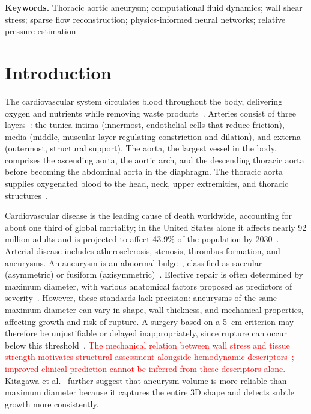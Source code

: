 \documentclass[12pt,a4paper]{article}
\newcommand{\cfdrevision}[1]{\textcolor{red}{#1}}
\theoremstyle{definition}
\numberwithin{equation}{section}
\begin{document}
\noindent\textbf{Keywords.} Thoracic aortic aneurysm; computational fluid dynamics; wall shear stress; sparse flow reconstruction; physics-informed neural networks; relative pressure estimation


\section{Introduction}
\label{sec:introduction}

The cardiovascular system circulates blood throughout the body, delivering oxygen and nutrients while removing waste products~\cite{heymans1960reflexogenic}. Arteries consist of three layers~\cite{holzapfel2010modelling}: the tunica intima (innermost, endothelial cells that reduce friction), media (middle, muscular layer regulating constriction and dilation), and externa (outermost, structural support). The aorta, the largest vessel in the body, comprises the ascending aorta, the aortic arch, and the descending thoracic aorta before becoming the abdominal aorta in the diaphragm. The thoracic aorta supplies oxygenated blood to the head, neck, upper extremities, and thoracic structures~\cite{tran2018anatomy}.

Cardiovascular disease is the leading cause of death worldwide, accounting for about one third of global mortality; in the United States alone it affects nearly 92 million adults and is projected to affect 43.9\% of the population by 2030~\cite{Randles_CFD_2017}. Arterial disease includes atherosclerosis, stenosis, thrombus formation, and aneurysms. An aneurysm is an abnormal bulge~\cite{Les_et_al_2010}, classified as saccular (asymmetric) or fusiform (axisymmetric)~\cite{sakalihasan2018abdominal}. Elective repair is often determined by maximum diameter, with various anatomical factors proposed as predictors of severity~\cite{cronenwett1990variables, lipp2020computational}. However, these standards lack precision: aneurysms of the same maximum diameter can vary in shape, wall thickness, and mechanical properties, affecting growth and risk of rupture. A surgery based on a 5~cm criterion may therefore be unjustifiable or delayed inappropriately, since rupture can occur below this threshold~\cite{darling1977autopsy, belkacemi2022flow}. \cfdrevision{The mechanical relation between wall stress and tissue strength motivates structural assessment alongside hemodynamic descriptors~\cite{bilgi2020effects, vorp1998mechanical}; improved clinical prediction cannot be inferred from these descriptors alone.} Kitagawa et al.~\cite{kitagawa2013role} further suggest that aneurysm volume is more reliable than maximum diameter because it captures the entire 3D shape and detects subtle growth more consistently.
\end{document}
